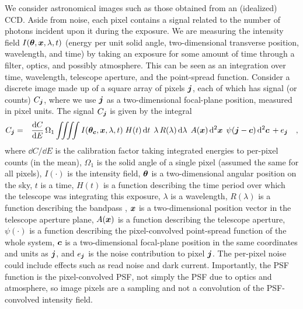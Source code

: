 We consider astronomical images such as those obtained from an
(idealized) CCD.  Aside from noise, each pixel contains a signal
related to the number of photons incident upon it during the exposure.
%
We are measuring the intensity field $I(\boldsymbol{\theta},\boldsymbol{x},\lambda,t)$
(energy per unit solid angle, two-dimensional transverse position,
wavelength, and time) by taking an exposure for some amount of time
through a filter, optics, and possibly atmosphere.  This can be seen
as an integration over time, wavelength, telescope aperture, and the
point-spread function.
%
Consider a discrete image made up of a square array of pixels $\boldsymbol{j}$,
each of which has signal (or counts) $C_{\boldsymbol{j}}$, where we use $\boldsymbol{j}$
as a two-dimensional focal-plane position, measured in pixel units.
The signal $C_{\boldsymbol{j}}$ is given by the integral
\begin{eqnarray}\displaystyle
C_{\jvec} &=& \frac{\dd C}{\dd E}\,\Omega_1\, %
\!
\int \!\!\!
\int \!\!\!
\int \!\!\!
\int
I(\thetavec_{\cvec},\posvec,\lambda,t)
\;H(t)\,
\dd t\,
\;
\lambda\,R(\lambda)\,
\dd\lambda\,
\;
A(\posvec)\,
\dd^2\posvec\,
\;
\psi(\jvec - \cvec)\,
\dd^2\cvec\,
 + \noise_{\jvec}
\quad,
\label{eqn:bigint}
\end{eqnarray}
where 
%
$\dd C/\dd E$ is the calibration factor taking integrated energies to per-pixel counts (in the mean),
%
$\Omega_1$ is the solid angle of a single pixel (assumed the same for all pixels),
%
$I(\cdot)$ is the intensity field,
%
$\boldsymbol{\theta}$ is a two-dimensional angular position on the sky,
%
$t$ is a time, $H(t)$ is a function describing the time period over which the telescope was
integrating this exposure,
%
$\lambda$ is a wavelength, $R(\lambda)$ is a function describing the bandpass \citep{kcorrect},
%
$\boldsymbol{x}$ is a two-dimensional position vector in the telescope aperture plane,
%
$A(\boldsymbol{x})$ is a function describing the telescope aperture,
%
$\psi(\cdot)$ is a function describing the pixel-convolved point-spread function of the
whole system,
%
$\boldsymbol{c}$ is a two-dimensional focal-plane position in the same coordinates and units as $\boldsymbol{j}$,
%
and
$e_{\boldsymbol{j}}$ is the noise contribution to pixel $\boldsymbol{j}$.
%
The per-pixel noise could include effects such as read noise and dark current.
%
Importantly, the PSF function is the pixel-convolved PSF, not simply
the PSF due to optics and atmosphere, so image pixels are a sampling
and not a convolution of the PSF-convolved intensity field.

